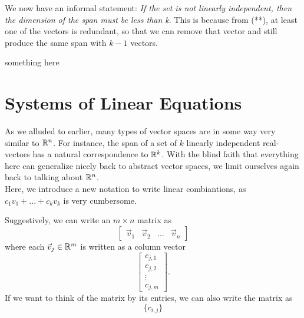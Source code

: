 We now have an informal statement: \textit{If the set is not linearly independent, then the dimension of the span must be less than k}.
This is because from (**), at least one of the vectors is redundant, so that we can remove that vector and still produce the same span with $k-1$ vectors.
\exercises
\begin{exerciselist}
	\item something here
\end{exerciselist}
\section{Systems of Linear Equations}
As we alluded to earlier, many types of vector spaces are in some way very similar to $\mathbb{R}^n$. For instance, the span of a set of $k$ linearly independent real-vectors has a natural correspondence to $\mathbb{R}^k$.
With the blind faith that everything here can generalize nicely back to abstract vector spaces, we limit ourselves again back to talking about $\mathbb{R}^n$.\\
Here, we introduce a new notation to write linear combiantions, as $c_1v_1+...+c_kv_k$ is very cumbersome.
\begin{notation}
	Suggestively, we can write an $m\times n$ matrix as \[
	\begin{bmatrix}
		\vec{v}_1 & \vec{v}_2 & ... & \vec{v}_n
	\end{bmatrix}
	\]
	where each $\vec{v}_j\in\mathbb{R}^m$ is written as a column vector\[
	\begin{bmatrix}
		c_{j,1} \\ c_{j,2}\\ \vdots \\ c_{j,m}
	\end{bmatrix}.
	\]
	If we want to think of the matrix by its entries, we can also write the matrix as \[
	\{c_{i,j}\}
	\]
\end{notation}
